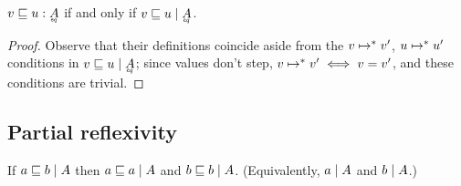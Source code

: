 \documentclass{article}
\begin{document}
\begin{theorem}
  \label{thm:agree-ineq}
  $v \ale u : \eq{A}$ if and only if $\lr{\eq{A}}{v \ale u}$.
\end{theorem}

\begin{proof}
  Observe that their definitions coincide aside from the $v \steps v'$, $u
  \steps u'$ conditions in $\lr{\eq{A}}{v \ale u}$; since values don't step, $v
  \steps v' \iff v = v'$, and these conditions are trivial.
\end{proof}

    
    
    
    


\subsection{Partial reflexivity}
\begin{theorem}\label{thm:prefl}
  If $\lr{A}{a \ale b}$ then $\lr{A}{a \ale a}$ and $\lr{A}{b \ale b}$.
  (Equivalently, $\lr{A}{a}$ and $\lr{A}{b}$.)
\end{theorem}
\end{document}
